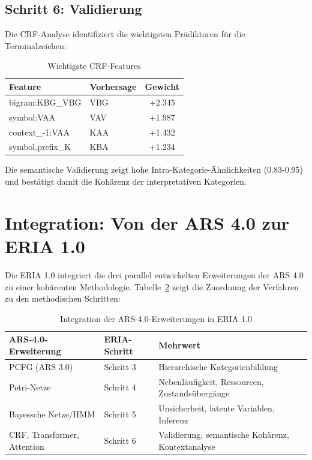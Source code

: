 \documentclass[12pt,a4paper]{article}
\begin{document}
\subsection{Schritt 6: Validierung}

Die CRF-Analyse identifiziert die wichtigsten Prädiktoren für die Terminalzeichen:

\begin{table}[H]
\centering
\caption{Wichtigste CRF-Features}
\label{tab:crf}
\begin{tabular}{@{} l l c @{}}
\toprule
\textbf{Feature} & \textbf{Vorhersage} & \textbf{Gewicht} \\
\midrule
bigram:KBG\_VBG & VBG & +2.345 \\
symbol:VAA & VAV & +1.987 \\
context\_-1:VAA & KAA & +1.432 \\
symbol.prefix\_K & KBA & +1.234 \\
\bottomrule
\end{tabular}
\end{table}

Die semantische Validierung zeigt hohe Intra-Kategorie-Ähnlichkeiten (0.83-0.95) 
und bestätigt damit die Kohärenz der interpretativen Kategorien.

\section{Integration: Von der ARS 4.0 zur ERIA 1.0}

Die ERIA 1.0 integriert die drei parallel entwickelten Erweiterungen der ARS 4.0 
zu einer kohärenten Methodologie. Tabelle~\ref{tab:integration} zeigt die 
Zuordnung der Verfahren zu den methodischen Schritten:

\begin{table}[H]
\centering
\caption{Integration der ARS-4.0-Erweiterungen in ERIA 1.0}
\label{tab:integration}
\begin{tabular}{@{} p{3cm} p{4cm} p{6cm} @{}}
\toprule
\textbf{ARS-4.0-Erweiterung} & \textbf{ERIA-Schritt} & \textbf{Mehrwert} \\
\midrule
PCFG (ARS 3.0) & Schritt 3 & Hierarchische Kategorienbildung \\
Petri-Netze & Schritt 4 & Nebenläufigkeit, Ressourcen, Zustandsübergänge \\
Bayessche Netze/HMM & Schritt 5 & Unsicherheit, latente Variablen, Inferenz \\
CRF, Transformer, Attention & Schritt 6 & Validierung, semantische Kohärenz, Kontextanalyse \\
\bottomrule
\end{tabular}
\end{table}
\end{document}
